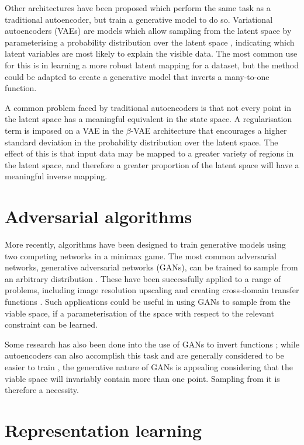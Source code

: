 \documentclass[../../main.tex]{subfiles}
\begin{document}
Other architectures have been proposed which perform the same task as a traditional autoencoder, but train a generative model to do so.
Variational autoencoders (VAEs) are models which allow sampling from the latent space by parameterising a probability distribution over the latent space \cite{kingma14}, indicating which latent variables are most likely to explain the visible data.
The most common use for this is in learning a more robust latent mapping for a dataset, but the method could be adapted to create a generative model that inverts a many-to-one function.

A common problem faced by traditional autoencoders is that not every point in the latent space has a meaningful equivalent in the state space.
A regularisation term is imposed on a VAE in the $\beta$-VAE architecture \cite{higgins16} that encourages a higher standard deviation in the probability distribution over the latent space.
The effect of this is that input data may be mapped to a greater variety of regions in the latent space, and therefore a greater proportion of the latent space will have a meaningful inverse mapping.

\section{Adversarial algorithms} \label{section:adversarialAlgorithms}

More recently, algorithms have been designed to train generative models using two competing networks in a minimax game.
The most common adversarial networks, generative adversarial networks (GANs), can be trained to sample from an arbitrary distribution \cite{goodfellow14, horger18}.
These have been successfully applied to a range of problems, including image resolution upscaling \cite{ledig17} and creating cross-domain transfer functions \cite{zhu18}.
Such applications could be useful in using GANs to sample from the viable space, if a parameterisation of the space with respect to the relevant constraint can be learned.

Some research has also been done into the use of GANs to invert functions \cite{anirudh18}; while autoencoders can also accomplish this task and are generally considered to be easier to train \cite{bang18}, the generative nature of GANs is appealing considering that the viable space will invariably contain more than one point.
Sampling from it is therefore a necessity.

\section{Representation learning} \label{section:representationLearning}
\end{document}

